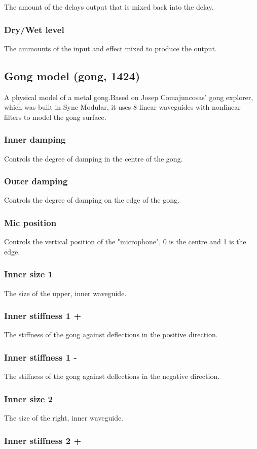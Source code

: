 \documentclass[11pt]{article}
\begin{document}
The amount of the delays output that is mixed back into the delay.\subsubsection*{Dry/Wet level}
The ammounts of the input and effect mixed to produce the output.\subsection{Gong model (gong, 1424)\label{gong}\label{id1424}}
A physical model of a metal gong.Based on Josep Comajuncosas' gong explorer, which was built in Sync Modular, it uses 8 linear waveguides with nonlinear filters to model the gong surface.\subsubsection*{Inner damping}
Controls the degree of damping in the centre of the gong.\subsubsection*{Outer damping}
Controls the degree of damping on the edge of the gong.\subsubsection*{Mic position}
Controls the vertical position of the "microphone", 0 is the centre and 1 is the edge.\subsubsection*{Inner size 1}
The size of the upper, inner waveguide.\subsubsection*{Inner stiffness 1 +}
The stiffness of the gong against deflections in the positive direction.\subsubsection*{Inner stiffness 1 -}
The stiffness of the gong against deflections in the negative direction.\subsubsection*{Inner size 2}
The size of the right, inner waveguide.\subsubsection*{Inner stiffness 2 +}
\end{document}
